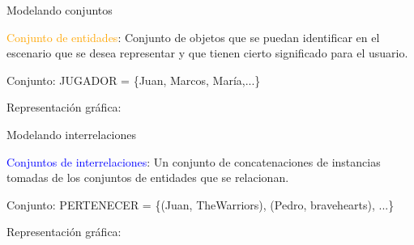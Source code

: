   



\begin{frame}{Modelando conjuntos}
    \begin{block}{}
        \textcolor{orange}{Conjunto de entidades}: Conjunto de objetos que se puedan identificar
        en el escenario que se desea representar y que tienen cierto
        significado para el usuario.

        \vspace{3mm}
        Conjunto: JUGADOR = \{Juan, Marcos, Mar\'ia,...\}
        \vspace{3mm}

        Representaci\'on gr\'afica:

        \vspace{3mm}
        \centering
    \end{block}

\end{frame}

\begin{frame}{Modelando interrelaciones}
    \begin{block}{}
        \textcolor{blue}{Conjuntos de interrelaciones}: Un conjunto
        de concatenaciones de instancias tomadas de los conjuntos
        de entidades que se relacionan.

        \vspace{3mm}

        Conjunto: PERTENECER = \{(Juan, TheWarriors), (Pedro, bravehearts), ...\}

        \vspace{3mm}

        Representaci\'on gr\'afica:

        \vspace{3mm}

        \centering
        
        \vspace {3mm}


    \end{block}

\end{frame}




